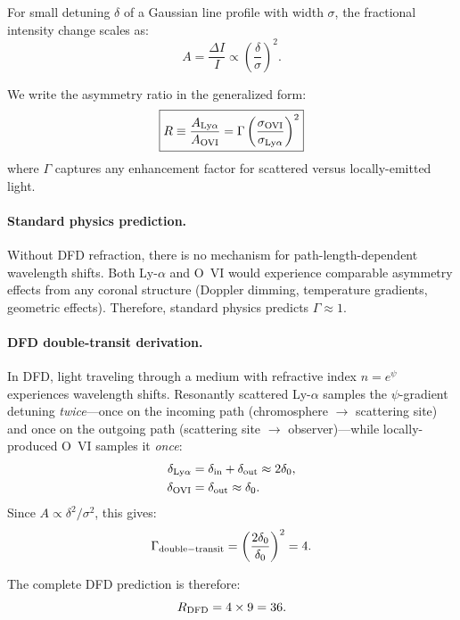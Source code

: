 For small detuning $\delta$ of a Gaussian line profile with width $\sigma$, the 
fractional intensity change scales as:
\begin{equation}
A = \frac{\Delta I}{I} \propto \left(\frac{\delta}{\sigma}\right)^2.
\end{equation}

We write the asymmetry ratio in the generalized form:
\begin{equation}
\boxed{R \equiv \frac{A_{\rm Ly\alpha}}{A_{\rm OVI}} = \Gamma \left(\frac{\sigma_{\rm OVI}}{\sigma_{\rm Ly\alpha}}\right)^2}
\label{eq:R-Gamma}
\end{equation}
where $\Gamma$ captures any enhancement factor for scattered versus locally-emitted light.

\paragraph{Standard physics prediction.}
Without DFD refraction, there is no mechanism for path-length-dependent wavelength 
shifts. Both Ly-$\alpha$ and O~VI would experience comparable asymmetry effects from 
any coronal structure (Doppler dimming, temperature gradients, geometric effects). 
Therefore, standard physics predicts $\Gamma \approx 1$.

\paragraph{DFD double-transit derivation.}
In DFD, light traveling through a medium with refractive index $n = e^\psi$ 
experiences wavelength shifts. Resonantly scattered Ly-$\alpha$ samples the $\psi$-gradient detuning \emph{twice}---once on the 
incoming path (chromosphere $\to$ scattering site) and once on the outgoing path 
(scattering site $\to$ observer)---while locally-produced O~VI samples it \emph{once}:
\begin{align}
\delta_{\rm Ly\alpha} &= \delta_{\rm in} + \delta_{\rm out} \approx 2\delta_0, \\
\delta_{\rm OVI} &= \delta_{\rm out} \approx \delta_0.
\end{align}
Since $A \propto \delta^2/\sigma^2$, this gives:
\begin{equation}
\Gamma_{\rm double-transit} = \left(\frac{2\delta_0}{\delta_0}\right)^2 = 4.
\end{equation}

The complete DFD prediction is therefore:
\begin{equation}
R_{\rm DFD} = 4 \times 9 = 36.
\end{equation}


